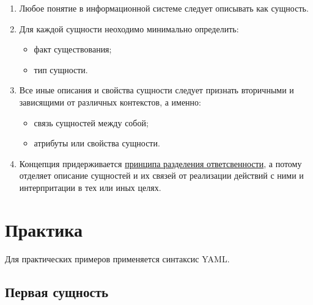 \documentclass[final]{article}
\begin{document}
        \begin{enumerate}
            \item Любое понятие в информационной системе следует описывать как 
            сущность.

            \item Для каждой сущности неоходимо минимально определить:
            \begin{itemize}
                \item факт существования;
                \item тип сущности.
            \end{itemize}

            \item Все иные описания и свойства сущности следует признать 
            вторичными и зависящими от различных контекстов, а именно:
            \begin{itemize}
                \item связь сущностей между собой;
                \item атрибуты или свойства сущности.
            \end{itemize}

            \item Концепция придерживается 
            \href{https://ru.wikipedia.org/wiki/%D0%A0%D0%B0%D0%B7%D0%B4%D0%B5%D0%BB%D0%B5%D0%BD%D0%B8%D0%B5_%D0%BE%D1%82%D0%B2%D0%B5%D1%82%D1%81%D1%82%D0%B2%D0%B5%D0%BD%D0%BD%D0%BE%D1%81%D1%82%D0%B8}{принципа 
            разделения ответсвенности}, а потому отделяет описание сущностей и их 
            связей от реализации действий с ними и интерпритации в тех или иных 
            целях.

        \end{enumerate}


    \section{Практика}

        Для практических примеров применяется синтаксис YAML.

        \subsection{Первая сущность}
\end{document}
